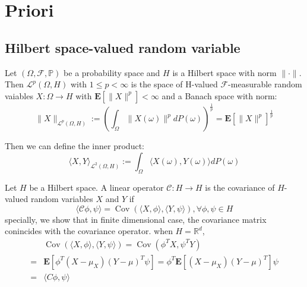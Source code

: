 \begin{theorem}
\begin{theorem}
\end{theorem}

\section{Priori}
\subsection{Hilbert space-valued random variable}
\begin{definition}
    Let $(\Omega, \mathcal{F}, \mathbb{P})$ be a probability space and $H$ is a Hilbert space with norm $\|\cdot\|$. Then $\mathcal{L}^p(\Omega, H)$ with $1\leq p<\infty$ is the space
    of H-valued $\mathcal{F}$-measurable random vaiables $X:\Omega\rightarrow H$ with $\mathbf{E}[\|X\|^p]<\infty$ and a Banach space with norm:
    \begin{equation}
        \|X\|_{\mathcal{L}^p(\Omega, H)}:=\left(\int_\Omega \|X(\omega)\|^pdP(\omega)\right)^{\frac{1}{p}}=\mathbf{E}[\|X\|^p]^{\frac{1}{p}}
    \end{equation}
\end{definition}
Then we can define the inner product: 
\begin{equation}
    \langle X, Y\rangle_{\mathcal{L}^2(\Omega, H)}:=\int_\Omega \langle X(\omega), Y(\omega)\rangle dP(\omega)
\end{equation}
\begin{definition}
    Let $H$ be a Hilbert space. A linear operator $\mathcal{C}:H\rightarrow H$ is the covariance of $H$-valued random variables $X$ and $Y$ if 
    \begin{equation}
        \langle\mathcal{C}\phi, \psi\rangle = \operatorname{Cov}\left(\langle X, \phi\rangle, \langle Y, \psi\rangle\right), \forall \phi, \psi \in H
    \end{equation}
    specially, we show that in finite dimensional case, the covariance matrix conincides with the covariance operator. 
    when $H = \mathbb{R}^d$,
    \begin{equation}
        \begin{aligned}
            &\operatorname{Cov}\left(\langle X, \phi\rangle, \langle Y, \psi\rangle\right) 
            = \operatorname{Cov}\left(\phi^T X, \psi^T Y\right)\\
            =&\mathbf{E}\left[\phi^T(X-\mu_X)(Y-\mu)^T\psi\right] 
            = \phi^T\mathbf{E}\left[(X-\mu_X)(Y-\mu)^T\right]\psi\\
            =&\langle C\phi, \psi\rangle
        \end{aligned}
    \end{equation}
\end{definition}


\end{theorem}
